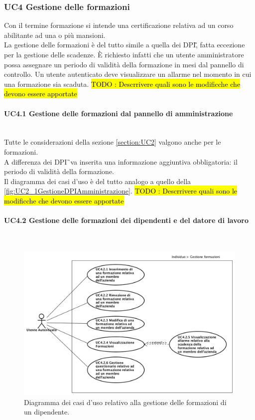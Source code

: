 	\subsubsection{UC4 Gestione delle formazioni}
		\label{section:UC4}
		Con il termine formazione si intende una certificazione relativa ad un corso abilitante ad una o più mansioni.\\
		La gestione delle formazioni è del tutto simile a quella dei \gls{DPI}\G, fatta eccezione per la gestione delle scadenze. È richiesto infatti che un utente amministratore possa assegnare un periodo di validità della formazione in mesi dal pannello di controllo. Un utente autenticato deve visualizzare un allarme nel momento in cui una formazione sia scaduta.
			\hl{TODO : Descrrivere quali sono le modificche che devono essere apportate}
	\paragraph*{UC4.1 Gestione delle formazioni dal pannello di amministrazione }\mbox{} \\
		\label{section:UC4_1}
		Tutte le considerazioni della sezione \ref{section:UC2} valgono anche per le formazioni. \\
		A differenza dei \gls{DPI}\G\ va inserita una informazione aggiuntiva obbligatoria: il periodo di validità della formazione. \\
		Il diagramma dei casi d'uso è del tutto analogo a quello della  \autoref{fig:UC2_1GestioneDPIAmministrazione}.
		\hl{TODO : Descrrivere quali sono le modificche che devono essere apportate}
	\paragraph*{UC4.2 Gestione delle formazioni dei dipendenti e del datore di lavoro }\mbox{} \\
		\label{section:UC4_2}
		\begin{figure}[H]
			\begin{center}
				\includegraphics[width=16cm]{Pics/UC4_2GestioneFormazioni.png}
				\caption{Diagramma dei casi d'uso relativo alla gestione delle formazioni di un dipendente.}
				\label{fig:UC4_2_Formazioni}
			\end{center}
		\end{figure}
		
